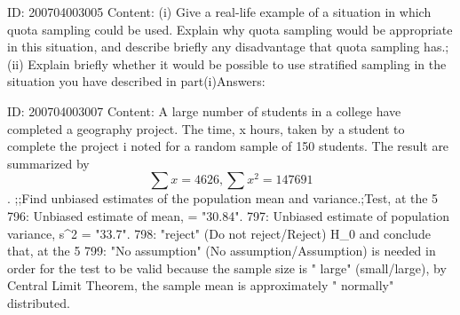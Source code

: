 \documentclass{article}
\begin{document}
ID: 200704003005
Content:
(i) Give a real-life example of a situation in which quota sampling could be used. Explain why quota sampling would be appropriate in this situation, and describe briefly any disadvantage that quota sampling has.;(ii) Explain briefly whether it would be possible to use stratified sampling in the situation you have described in part(i)Answers:

ID: 200704003007
Content:
A large number of students in a college have completed a geography project. The time, x hours, taken by a student to complete the project i noted for a random sample of 150 students. The result are summarized by $$ \sum x = 4626, \sum x^2 = 147691$$. ;;Find unbiased estimates of the population mean and variance.;Test, at the 5%
796: Unbiased estimate of mean, \mu = "30.84".
797: Unbiased estimate of population variance, s^2 = "33.7".
798: "reject" (Do not reject/Reject) H_0 and conclude that, at the 5%
799: "No assumption" (No assumption/Assumption) is needed in order for the test to be valid because the sample size is " large" (small/large), by Central Limit Theorem, the sample mean is approximately " normally" distributed.
\end{document}
